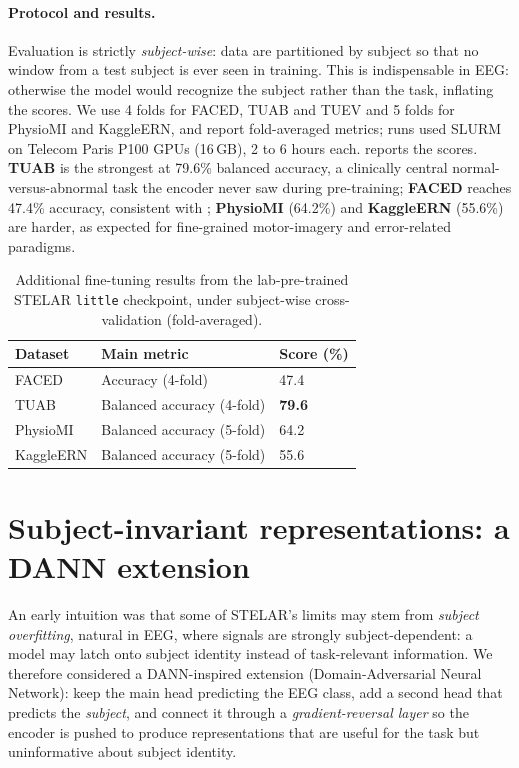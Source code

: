 \documentclass[11pt]{article}
\begin{document}
\paragraph{Protocol and results.} Evaluation is strictly \emph{subject-wise}: data
are partitioned by subject so that no window from a test subject is ever seen in
training. This is indispensable in EEG: otherwise the model would recognize the
subject rather than the task, inflating the scores. We use 4 folds for FACED, TUAB
and TUEV and 5 folds for PhysioMI and KaggleERN, and report fold-averaged metrics;
runs used SLURM on Telecom Paris P100 GPUs (16\,GB), 2 to 6 hours each.
 reports the scores. \textbf{TUAB} is the strongest at 79.6\%
balanced accuracy, a clinically central normal-versus-abnormal task the encoder
never saw during pre-training; \textbf{FACED} reaches 47.4\% accuracy, consistent
with ; \textbf{PhysioMI} (64.2\%) and \textbf{KaggleERN}
(55.6\%) are harder, as expected for fine-grained motor-imagery and error-related
paradigms.

\begin{table}[t]
\centering
\caption{Additional fine-tuning results from the lab-pre-trained STELAR
\texttt{little} checkpoint, under subject-wise cross-validation (fold-averaged).}
\label{tab:ft-extra}
\small
\begin{tabular}{lll}
\toprule
Dataset & Main metric & Score (\%) \\
\midrule
FACED     & Accuracy (4-fold)          & 47.4 \\
TUAB      & Balanced accuracy (4-fold) & \textbf{79.6} \\
PhysioMI  & Balanced accuracy (5-fold) & 64.2 \\
KaggleERN & Balanced accuracy (5-fold) & 55.6 \\
\bottomrule
\end{tabular}
\end{table}

\section{Subject-invariant representations: a DANN extension}
\label{sec:dann}

An early intuition was that some of STELAR's limits may stem from \emph{subject
overfitting}, natural in EEG, where signals are strongly subject-dependent: a
model may latch onto subject identity instead of task-relevant information. We
therefore considered a DANN-inspired extension (Domain-Adversarial Neural
Network): keep the main head predicting the EEG class, add a second head that
predicts the \emph{subject}, and connect it through a \emph{gradient-reversal
layer} so the encoder is pushed to produce representations that are useful for the
task but uninformative about subject identity.
\end{document}
